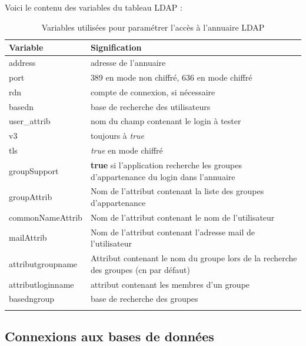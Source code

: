 Voici le contenu des variables du tableau LDAP : 
\begin{longtable}{|p{5cm}|p{8cm}|}
\hline
\textbf{Variable} & \textbf{Signification} \\
\hline
\endhead
address &  adresse de l'annuaire\\
\hline
port & 389 en mode non chiffré, 636 en mode chiffré\\
\hline
rdn & compte de connexion, si nécessaire \\
\hline
basedn & base de recherche des utilisateurs\\
\hline
user\_attrib & nom du champ contenant le login à tester\\
\hline
v3 & toujours à \textit{true}\\
\hline
tls & \textit{true} en mode chiffré\\
\hline
groupSupport & \textbf{true} si l'application recherche les groupes d'appartenance du login dans l'annuaire\\
\hline
groupAttrib & Nom de l'attribut contenant la liste des groupes d'appartenance\\
\hline
commonNameAttrib & Nom de l'attribut contenant le nom de l'utilisateur\\
\hline
mailAttrib & Nom de l'attribut contenant l'adresse mail de l'utilisateur\\
\hline
attributgroupname & Attribut contenant le nom du groupe lors de la recherche des groupes (cn par défaut)\\
\hline
attributloginname & attribut contenant les membres d'un groupe\\
\hline
basedngroup & base de recherche des groupes \\
\hline
\caption{Variables utilisées pour paramétrer l'accès à l'annuaire LDAP}
\end{longtable}

\subsection{Connexions aux bases de données}

